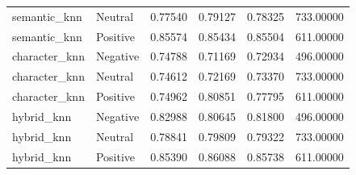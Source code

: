 \begin{tabular}{llrrrr}
semantic_knn & Neutral & 0.77540 & 0.79127 & 0.78325 & 733.00000 \\
semantic_knn & Positive & 0.85574 & 0.85434 & 0.85504 & 611.00000 \\
character_knn & Negative & 0.74788 & 0.71169 & 0.72934 & 496.00000 \\
character_knn & Neutral & 0.74612 & 0.72169 & 0.73370 & 733.00000 \\
character_knn & Positive & 0.74962 & 0.80851 & 0.77795 & 611.00000 \\
hybrid_knn & Negative & 0.82988 & 0.80645 & 0.81800 & 496.00000 \\
hybrid_knn & Neutral & 0.78841 & 0.79809 & 0.79322 & 733.00000 \\
hybrid_knn & Positive & 0.85390 & 0.86088 & 0.85738 & 611.00000 \\
\bottomrule
\end{tabular}
